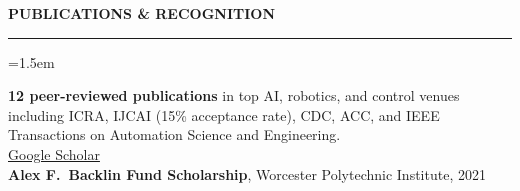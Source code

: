 \documentclass{resume}
\renewenvironment{rSection}[1]{%
  \sectionskip
  {\color{accent}\MakeUppercase{\bf #1}}%
  \sectionlineskip
  {\color{accent}\hrule}%
  \begin{list}{}{\leftmargin=1.5em}%
  \item[]
}{%
  \end{list}
}
\begin{document}
\begin{rSection}{Publications \& Recognition}
\textbf{12 peer-reviewed publications} in top AI, robotics, and control venues including
ICRA, IJCAI (15\% acceptance rate), CDC, ACC, and IEEE Transactions on Automation Science
and Engineering. \\[3pt]
\href{https://scholar.google.com/citations?user=KWUJ10wAAAAJ}{Google Scholar}\\[3pt]
\textbf{Alex F.\ Backlin Fund Scholarship}, Worcester Polytechnic Institute, 2021
\end{rSection}
\end{document}
